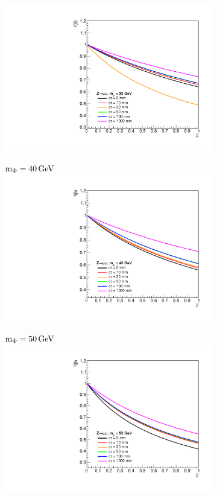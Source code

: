 \begin{figure}[htb!]
\begin{subfigure}{0.3\linewidth}
		\includegraphics[width=\linewidth]{figs/05_analysis/BR_Z_MU_30.pdf}
	\end{subfigure}
	\begin{subfigure}{0.3\linewidth}
		\centering
		$\text{m}_\Phi=40\,\text{Ge\hspace{-.08em}V}$
		\includegraphics[width=\linewidth]{figs/05_analysis/BR_Z_MU_40.pdf}
	\end{subfigure}
	\begin{subfigure}{0.3\linewidth}
		\centering
		$\text{m}_\Phi=50\,\text{Ge\hspace{-.08em}V}$
		\includegraphics[width=\linewidth]{figs/05_analysis/BR_Z_MU_50.pdf}

\end{subfigure}
\end{figure}
